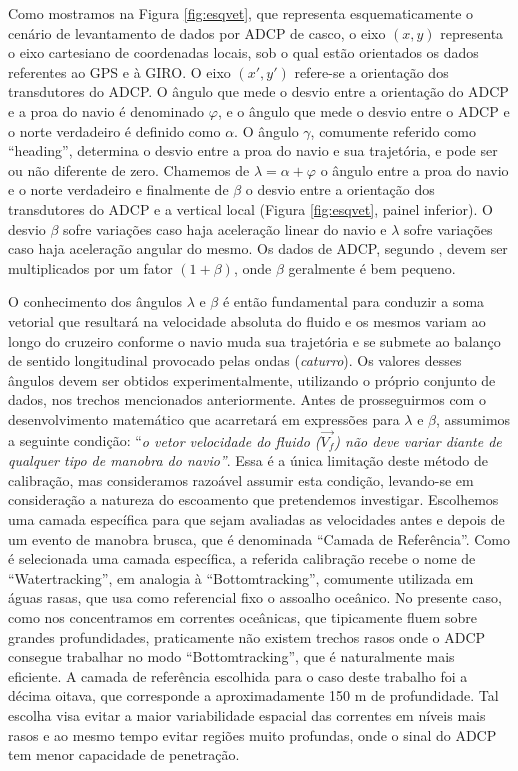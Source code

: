 Como mostramos na Figura \ref{fig:esqvet}, que representa esquematicamente o cenário de levantamento de dados por ADCP de casco,
 o eixo $(x,y)$ representa o eixo cartesiano de coordenadas locais, sob
o qual estão orientados os dados referentes ao GPS e à GIRO. O eixo $(x',y')$ refere-se a orientação dos transdutores 
do ADCP. O ângulo que mede o desvio entre a orientação do ADCP e a proa do navio é denominado $\varphi$, e o ângulo que 
mede o desvio entre o ADCP e o norte verdadeiro é definido como $\alpha$. O ângulo $\gamma$, comumente referido 
como ``heading'', determina o desvio entre a proa do navio e sua trajetória, e pode ser ou não diferente de zero.
Chamemos de $\lambda = \alpha + \varphi$ o ângulo entre a proa do navio e o norte verdadeiro e finalmente de
$\beta$ o desvio entre a orientação dos transdutores do ADCP e a vertical local (Figura \ref{fig:esqvet}, 
painel inferior). O desvio $\beta$ sofre variações caso haja aceleração linear do navio e $\lambda$ sofre variações
 caso haja aceleração angular do mesmo. Os dados de ADCP, segundo \cite{joyce1989}, 
devem ser multiplicados por um fator $(1+\beta)$, onde $\beta$ geralmente é bem pequeno.

O conhecimento dos ângulos $\lambda$ e $\beta$ é então fundamental para conduzir a soma vetorial que resultará
na velocidade absoluta do fluido e os mesmos variam ao longo do cruzeiro conforme o navio muda sua trajetória e 
se submete ao balanço de sentido longitudinal provocado pelas ondas ({\it caturro}).
Os valores desses ângulos devem ser obtidos experimentalmente, utilizando o próprio conjunto de dados, nos trechos
mencionados anteriormente. Antes de prosseguirmos com o desenvolvimento matemático que acarretará em expressões para 
 $\lambda$ e $\beta$, assumimos a seguinte condição: ``{\it o vetor velocidade do fluido ($\vec{V_f}$) não deve variar
diante de qualquer tipo de manobra do navio''}. Essa é a única limitação deste método de calibração, mas consideramos
razoável assumir esta condição, levando-se em consideração a natureza do escoamento que pretendemos investigar. Escolhemos
uma camada específica para que sejam avaliadas as velocidades antes e depois de um evento de manobra brusca, que é denominada
``Camada de Referência''. Como é selecionada uma camada específica, a referida calibração recebe o nome de 
``Watertracking'', em analogia à ``Bottomtracking'', comumente utilizada em águas rasas, que usa como referencial fixo 
o assoalho oceânico. No presente caso, como nos concentramos em correntes oceânicas, que tipicamente fluem sobre
grandes profundidades, praticamente não existem trechos rasos onde o ADCP consegue trabalhar no modo ``Bottomtracking'', que é 
naturalmente mais eficiente. A camada de referência escolhida para o caso deste trabalho foi a décima oitava, que
corresponde a aproximadamente 150 m de profundidade. Tal escolha visa evitar a maior variabilidade espacial das correntes
em níveis mais rasos e ao mesmo tempo evitar regiões muito profundas, onde o sinal do ADCP tem menor capacidade de penetração. 
  
